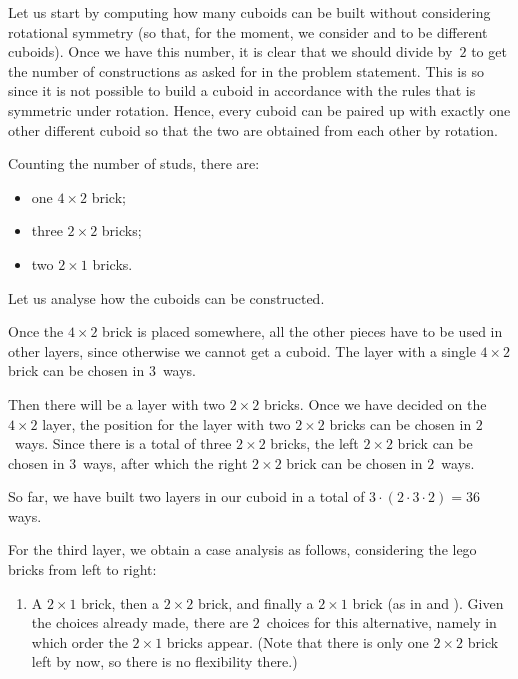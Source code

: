 \documentclass{jn-pset}
\begin{document}
\begin{problem}
\begin{solution}
%   
  Let us start by computing how many cuboids can be built without
  considering rotational symmetry (so that, for the moment, we consider
  and
  to be different cuboids). Once we have this number, it is clear that
  we should divide by~$2$ to get the number of constructions
  as asked for in the problem statement. This is so since it is not
  possible to build a cuboid in accordance with the rules that is
  symmetric under rotation. Hence, every cuboid can be paired up with
  exactly one other different cuboid so that the two are obtained from each
  other by rotation.

  Counting the number of studs, there are:
  \begin{itemize}
  \item 
    one $4 \times 2$ brick;
  \item 
    three $2 \times 2$ bricks;
  \item 
    two $2 \times 1$ bricks.
  \end{itemize}
%
  Let us analyse how the cuboids can be constructed.

{}
{}
  
  Once the $4 \times 2$ brick is placed somewhere, all the other
  pieces have to be used in other layers, 
  since otherwise we cannot get a cuboid.
  The layer with a single
  $4 \times 2$ brick can be chosen in $3$~ways.

  Then there will be a layer with two $2 \times 2$ bricks.
  Once we have decided on the $4 \times 2$ layer, the position for the
  layer with two  $2 \times 2$ bricks can be chosen in $2$~ways. 
  Since there is a total of three $2 \times 2$ bricks,
  the left  $2 \times 2$ brick can be chosen in $3$~ways, after which
  the right 
  $2 \times 2$ brick can be chosen in $2$~ways.

  So far, we have built two layers in our cuboid in a total of
  $
  3 \cdot (2 \cdot 3 \cdot 2)
  =
  36 
  $
  ways.

  For the third layer, we obtain a case analysis as follows,
  considering the lego bricks from left to right:
  \begin{enumerate}
  \item 
    \label{item:layer-3-1}
    A $2 \times 1$ brick,
    then a  $2 \times 2$ brick,
    and finally a  $2 \times 1$ brick
    (as in 
    and
    ).
    Given the choices already made, there are $2$~choices for this
    alternative,
    namely in which order the
    $2 \times 1$ bricks appear.
    (Note that there is only one $2 \times 2$ brick left by now, so
    there is no flexibility there.)


\end{enumerate}
\end{solution}
\end{problem}
\end{document}
